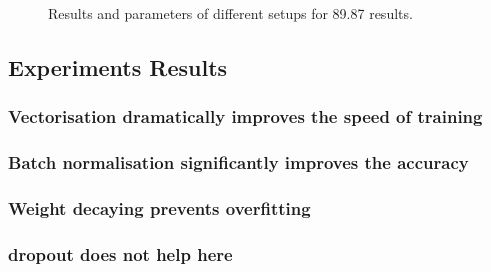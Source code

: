 \begin{figure}
    \caption{\label{fig:my-label}Results and parameters of different setups for 89.87 results.}
\end{figure}

\subsection{Experiments Results}
\subsubsection{Vectorisation dramatically improves the speed of training}
\subsubsection{Batch normalisation significantly improves the accuracy}
\subsubsection{Weight decaying prevents overfitting}
\subsubsection{dropout does not help here}
